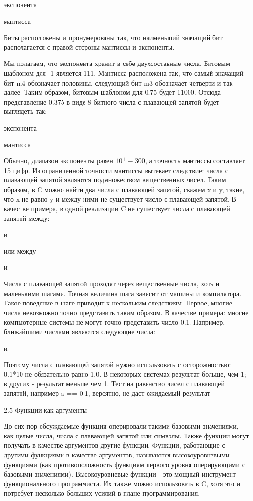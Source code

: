экспонента

мантисса

Биты расположены и пронумерованы так, что наименьший значащий бит располагается с правой стороны мантиссы и экспоненты.

Мы полагаем, что экспонента хранит в себе двухсоставные числа. Битовым шаблоном для -1 является 111. Мантисса расположена так, что самый значащий бит m4 обозначает половины, следующий бит m3 обозначает четверти и так далее. Таким образом, битовым шаблоном для 0.75 будет 11000. Отсюда представление 0.375 в виде 8-битного числа с плавающей запятой будет выглядеть так:

экспонента

мантисса

Обычно, диапазон экспоненты равен $10^+-300$, а точность мантиссы составляет 15 цифр. Из ограниченной точности мантиссы вытекает следствие: числа с плавающей запятой являются подмножеством вещественных чисел. Таким образом, в C можно найти два числа с плавающей запятой, скажем x и y, такие, что x не равно y и между ними не существует число с плавающей запятой. В качестве примера, в одной реализации C не существует числа с плавающей запятой между:

и

или между

и

Числа с плавающей запятой проходят через вещественные числа, хоть и маленькими шагами. Точная величина шага зависит от машины и компилятора. Такое поведение в шаге приводит к нескольким следствиям. Первое, многие числа невозможно точно представить таким образом. В качестве примера: многие компьютерные системы не могут точно представить число 0.1. Например, ближайшими числами являются следующие числа:

и

Поэтому числа с плавающей запятой нужно использовать с осторожностью: 0.1*10 не обязательно равно 1.0. В некоторых системах результат больше, чем 1; в других - результат меньше чем 1. Тест на равенство чисел с плавающей запятой, например a == 0.1, вероятно, не даст ожидаемый результат.

2.5 Функции как аргументы

До сих пор обсуждаемые функции оперировали такими базовыми значениями, как целые числа, числа с плавающей запятой или символы. Также функции могут получать в качестве аргументов другие функции. Функции, работающие с другими функциями в качестве аргументов, называются высокоуровневыми функциями (как противоположность функциям первого уровня оперирующими с базовыми значениями). Высокоуровневые функции - это мощный инструмент функционального программиста. Их также можно использовать в C, хотя это и потребует несколько больших усилий в плане программирования.

